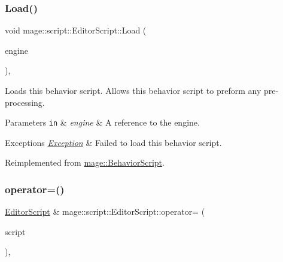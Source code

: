 \subsubsection{\texorpdfstring{Load()}{Load()}}
{\footnotesize\ttfamily void mage\+::script\+::\+Editor\+Script\+::\+Load (\begin{DoxyParamCaption}\item[{\mbox{[}\mbox{[}maybe\+\_\+unused\mbox{]} \mbox{]} \mbox{\hyperlink{classmage_1_1_engine}{Engine}} \&}]{engine }\end{DoxyParamCaption})\hspace{0.3cm}{\ttfamily [override]}, {\ttfamily [virtual]}}

Loads this behavior script. Allows this behavior script to preform any pre-\/processing.


\begin{DoxyParams}[1]{Parameters}
\mbox{\tt in}  & {\em engine} & A reference to the engine. \\
\hline
\end{DoxyParams}

\begin{DoxyExceptions}{Exceptions}
{\em \mbox{\hyperlink{classmage_1_1_exception}{Exception}}} & Failed to load this behavior script. \\
\hline
\end{DoxyExceptions}


Reimplemented from \mbox{\hyperlink{classmage_1_1_behavior_script_ae7864876b2ffb1d1d8d8a56e3099f1f2}{mage\+::\+Behavior\+Script}}.

\mbox{\label{classmage_1_1script_1_1_editor_script_ab7b4dda8389d07d41eba1474491b4a36}} 
\subsubsection{\texorpdfstring{operator=()}{operator=()}\hspace{0.1cm}{\footnotesize\ttfamily [1/2]}}
{\footnotesize\ttfamily \mbox{\hyperlink{classmage_1_1script_1_1_editor_script}{Editor\+Script}} \& mage\+::script\+::\+Editor\+Script\+::operator= (\begin{DoxyParamCaption}\item[{const \mbox{\hyperlink{classmage_1_1script_1_1_editor_script}{Editor\+Script}} \&}]{script }\end{DoxyParamCaption})\hspace{0.3cm}{\ttfamily [default]}, {\ttfamily [noexcept]}}

